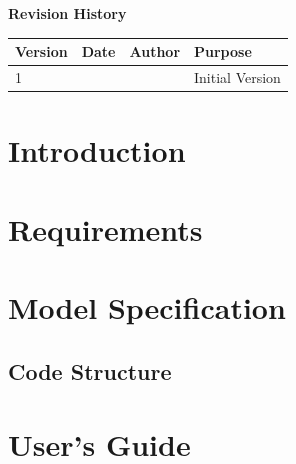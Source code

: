 \documentclass[11pt,fleqn]{report}
\begin{document}
\pagestyle{empty}
\titlePage
{}
\tableofcontents %
\vfill
{\Large \textbf {Revision History}}
{\large
\begin{center}
\begin{tabular}{|l||l|l|l|}
\hline
 \textbf{Version} & \textbf{Date} & \textbf{Author} & \textbf{Purpose} \\ \hline \hline
                1 &               &                 & Initial Version  \\ \hline
\end{tabular}
\end{center}
}

\chapter{Introduction} %

\chapter{Requirements}
\chapter{Model Specification}
\section{Code Structure} %
\chapter{User's Guide}
\end{document}
